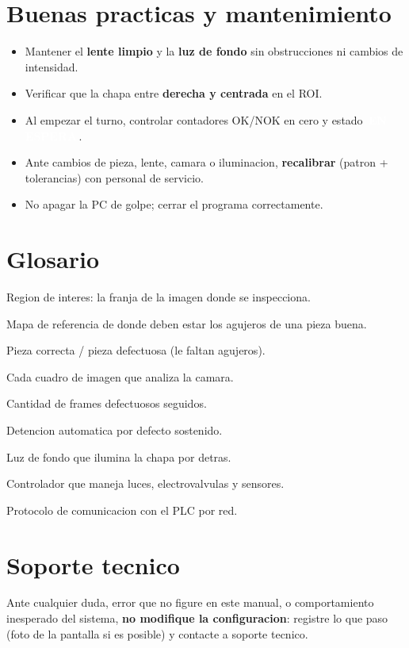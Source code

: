 \documentclass[11pt,a4paper]{article}
\newcommand{\estado}[2]{\colorbox{#1}{\textcolor{white}{\small\,\textbf{#2}\,}}}
\begin{document}
\section{Buenas practicas y mantenimiento}
\begin{itemize}[leftmargin=1.4em]
  \item Mantener el \textbf{lente limpio} y la \textbf{luz de fondo} sin
        obstrucciones ni cambios de intensidad.
  \item Verificar que la chapa entre \textbf{derecha y centrada} en el ROI.
  \item Al empezar el turno, controlar contadores OK/NOK en cero y estado
        \estado{idleBlue}{EN ESPERA}.
  \item Ante cambios de pieza, lente, camara o iluminacion, \textbf{recalibrar}
        (patron + tolerancias) con personal de servicio.
  \item No apagar la PC de golpe; cerrar el programa correctamente.
\end{itemize}

\section{Glosario}
\begin{description}[leftmargin=2.2cm,style=nextline]
  \item[ROI] Region de interes: la franja de la imagen donde se inspecciona.
  \item[Patron] Mapa de referencia de donde deben estar los agujeros de una
        pieza buena.
  \item[OK / NOK] Pieza correcta / pieza defectuosa (le faltan agujeros).
  \item[Frame] Cada cuadro de imagen que analiza la camara.
  \item[Racha NOK] Cantidad de frames defectuosos seguidos.
  \item[Parada de maquina] Detencion automatica por defecto sostenido.
  \item[Backlight] Luz de fondo que ilumina la chapa por detras.
  \item[PLC] Controlador que maneja luces, electrovalvulas y sensores.
  \item[Modbus TCP] Protocolo de comunicacion con el PLC por red.
\end{description}

\section*{Soporte tecnico}
\begin{infobox}
Ante cualquier duda, error que no figure en este manual, o comportamiento
inesperado del sistema, \textbf{no modifique la configuracion}: registre lo
que paso (foto de la pantalla si es posible) y contacte a soporte tecnico.
\end{infobox}
\end{document}
